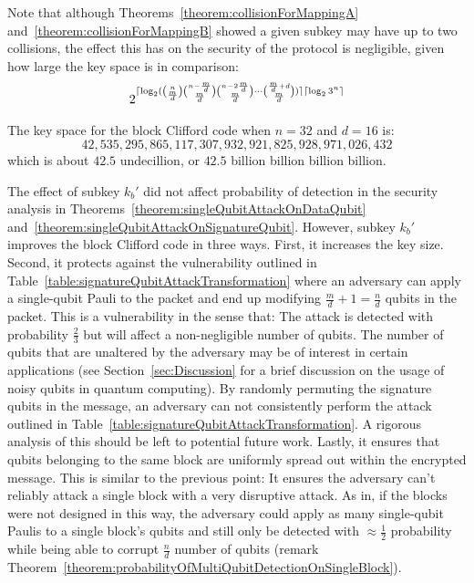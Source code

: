 Note that although Theorems~\ref{theorem:collisionForMappingA} and~\ref{theorem:collisionForMappingB} showed a given subkey may have up to two collisions, the effect this has on the security of the protocol is negligible, given how large the key space is in comparison:
\begin{align}
2^{\lceil\log_2 ({n \choose \frac{m}{d}}{n - \frac{m}{d} \choose \frac{m}{d}}{n - 2\frac{m}{d} \choose \frac{m}{d}}\cdots{\frac{m}{d} + d \choose \frac{m}{d}})\rceil\lceil\log_2 3^n\rceil}
\end{align}

\begin{example}
The key space for the block Clifford code when $n = 32$ and $d = 16$ is:
$$42,535,295,865,117,307,932,921,825,928,971,026,432$$
which is about $42.5$ undecillion, or $42.5$ billion billion billion billion.
\end{example}

The effect of subkey $k_b'$ did not affect probability of detection in the security analysis in Theorems~\ref{theorem:singleQubitAttackOnDataQubit} and~\ref{theorem:singleQubitAttackOnSignatureQubit}. However, subkey $k_b'$ improves the block Clifford code in three ways. First, it increases the key size. Second, it protects against the vulnerability outlined in Table~\ref{table:signatureQubitAttackTransformation} where an adversary can apply a single-qubit Pauli to the packet and end up modifying $\frac{m}{d} + 1 = \frac{n}{d}$ qubits in the packet. This is a vulnerability in the sense that: The attack is detected with probability $\frac{2}{3}$ but will affect a non-negligible number of qubits. The number of qubits that are unaltered by the adversary may be of interest in certain applications (see Section~\ref{sec:Discussion} for a brief discussion on the usage of noisy qubits in quantum computing). By randomly permuting the signature qubits in the message, an adversary can not consistently perform the attack outlined in Table~\ref{table:signatureQubitAttackTransformation}. A rigorous analysis of this should be left to potential future work. Lastly, it ensures that qubits belonging to the same block are uniformly spread out within the encrypted message. This is similar to the previous point: It ensures the adversary can't reliably attack a single block with a very disruptive attack. As in, if the blocks were not designed in this way, the adversary could apply as many single-qubit Paulis to a single block's qubits and still only be detected with $\approx \frac{1}{2}$ probability while being able to corrupt $\frac{n}{d}$ number of qubits (remark Theorem~\ref{theorem:probabilityOfMultiQubitDetectionOnSingleBlock}).

